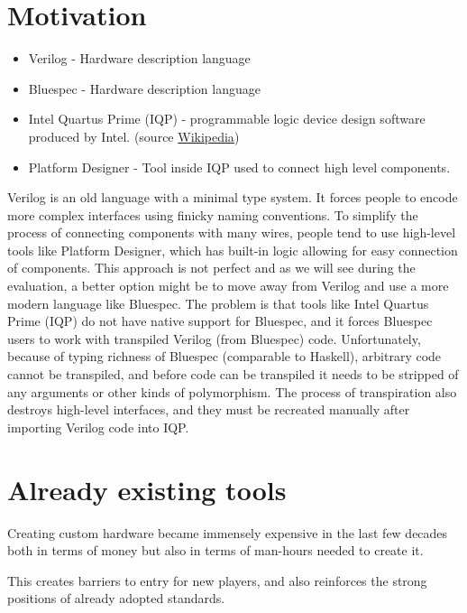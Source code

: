 \documentclass[12pt]{report}
\begin{document}
\section{Motivation}
\begin{tcolorbox}[title=Vocabulary]
    \begin{itemize}
        \item Verilog - Hardware description language
        \item Bluespec - Hardware description language
        \item Intel Quartus Prime (IQP) - programmable logic device design software produced by Intel. (source \href{https://en.wikipedia.org/wiki/Intel_Quartus_Prime}{Wikipedia})
        \item Platform Designer - Tool inside IQP used to connect high level components.
    \end{itemize}
\end{tcolorbox}
Verilog is an old language with a minimal type system. It forces people to encode more complex interfaces using finicky naming conventions. To simplify the process of connecting components with many wires, people tend to use high-level tools like Platform Designer, which has built-in logic allowing for easy connection of components. This approach is not perfect and as we will see during the evaluation, a better option might be to move away from Verilog and use a more modern language like Bluespec. The problem is that tools like Intel Quartus Prime (IQP) do not have native support for Bluespec, and it forces Bluespec users to work with transpiled Verilog (from Bluespec) code. Unfortunately, because of typing richness of Bluespec (comparable to Haskell), arbitrary code cannot be transpiled, and before code can be transpiled it needs to be stripped of any arguments or other kinds of polymorphism. The process of transpiration also destroys high-level interfaces, and they must be recreated manually after importing Verilog code into IQP.

\section{Already existing tools}
Creating custom hardware became immensely expensive in the last few decades both in terms of money but also in terms of man-hours needed to create it.  

This creates barriers to entry for new players, and also reinforces the strong positions of already adopted standards.  
\end{document}
